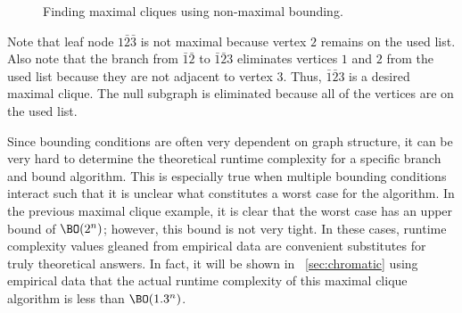 \begin{figure}[H]
  \centering
  \caption{Finding maximal cliques using non-maximal bounding.}
  \label{fig:boundnonmax}
\end{figure}

Note that leaf node \(1\bar{2}\bar{3}\) is not maximal because vertex \(2\) remains on the used list.  Also note
that the branch from \(\bar{1}\bar{2}\) to \(\bar{1}\bar{2}3\) eliminates vertices \(1\) and \(2\) from the used
list because they are not adjacent to vertex \(3\).  Thus, \(\bar{1}\bar{2}3\) is a desired maximal clique.  The
null subgraph is eliminated because all of the vertices are on the used list.

Since bounding conditions are often very dependent on graph structure, it can be very hard to determine the
theoretical runtime complexity for a specific branch and bound algorithm.  This is especially true when multiple
bounding conditions interact such that it is unclear what constitutes a worst case for the algorithm.  In the
previous maximal clique example, it is clear that the worst case has an upper bound of \(\BO(2^n)\); however, this
bound is not very tight.  In these cases, runtime complexity values gleaned from empirical data are convenient
substitutes for truly theoretical answers.  In fact, it will be shown in \sectionname~\ref{sec:chromatic} using
empirical data that the actual runtime complexity of this maximal clique algorithm is less than \(\BO(1.3^n)\).

